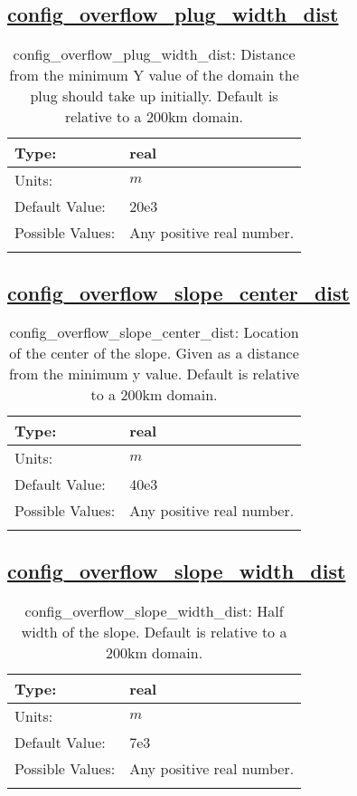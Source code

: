 \subsection[config\_overflow\_plug\_width\_dist]{\hyperref[sec:nm_tab_overflow]{config\_overflow\_plug\_width\_dist}}
\label{subsec:nm_sec_config_overflow_plug_width_dist}
\begin{center}
\begin{longtable}{| p{2.0in} || p{4.0in} |}
    \hline
    Type: & real \\
    \hline
    Units: & $m$ \\
    \hline
    Default Value: & 20e3 \\
    \hline
    Possible Values: & Any positive real number. \\
    \hline
    \caption{config\_overflow\_plug\_width\_dist: Distance from the minimum Y value of the domain the plug should take up initially. Default is relative to a 200km domain.}
\end{longtable}
\end{center}
\subsection[config\_overflow\_slope\_center\_dist]{\hyperref[sec:nm_tab_overflow]{config\_overflow\_slope\_center\_dist}}
\label{subsec:nm_sec_config_overflow_slope_center_dist}
\begin{center}
\begin{longtable}{| p{2.0in} || p{4.0in} |}
    \hline
    Type: & real \\
    \hline
    Units: & $m$ \\
    \hline
    Default Value: & 40e3 \\
    \hline
    Possible Values: & Any positive real number. \\
    \hline
    \caption{config\_overflow\_slope\_center\_dist: Location of the center of the slope. Given as a distance from the minimum y value. Default is relative to a 200km domain.}
\end{longtable}
\end{center}
\subsection[config\_overflow\_slope\_width\_dist]{\hyperref[sec:nm_tab_overflow]{config\_overflow\_slope\_width\_dist}}
\label{subsec:nm_sec_config_overflow_slope_width_dist}
\begin{center}
\begin{longtable}{| p{2.0in} || p{4.0in} |}
    \hline
    Type: & real \\
    \hline
    Units: & $m$ \\
    \hline
    Default Value: & 7e3 \\
    \hline
    Possible Values: & Any positive real number. \\
    \hline
    \caption{config\_overflow\_slope\_width\_dist: Half width of the slope. Default is relative to a 200km domain.}
\end{longtable}
\end{center}
